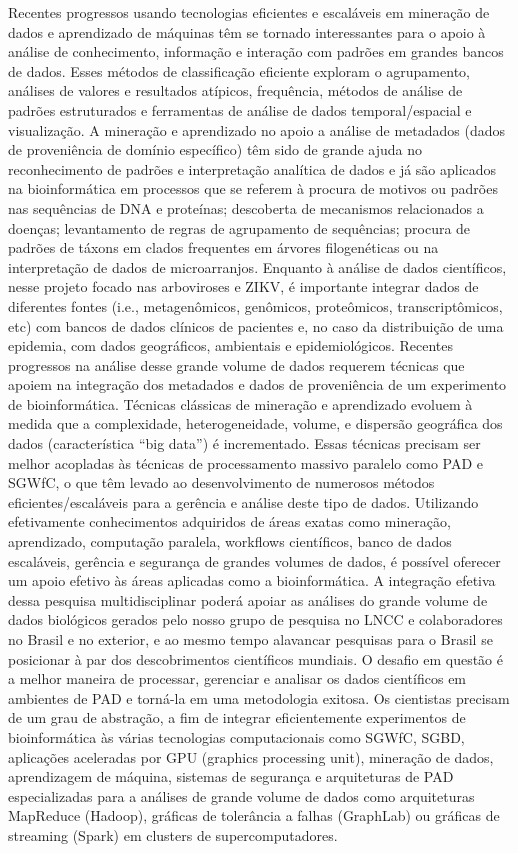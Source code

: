 Recentes progressos usando tecnologias eficientes e escaláveis em mineração de dados e aprendizado de máquinas têm se tornado interessantes para o apoio à análise de conhecimento, informação e interação com padrões em grandes bancos de dados. Esses métodos de classificação eficiente exploram o agrupamento, análises de valores e resultados atípicos, frequência, métodos de análise de padrões estruturados e ferramentas de análise de dados temporal/espacial e visualização. A mineração e aprendizado no apoio a análise de metadados (dados de proveniência de domínio específico) têm sido de grande ajuda no reconhecimento de padrões e interpretação analítica de dados e já são aplicados na bioinformática em processos que se referem à procura de motivos ou padrões nas sequências de DNA e proteínas; descoberta de mecanismos relacionados a doenças; levantamento de regras de agrupamento de sequências; procura de padrões de táxons em clados frequentes em árvores filogenéticas ou na interpretação de dados de microarranjos. 
Enquanto à análise de dados científicos, nesse projeto focado nas arboviroses e ZIKV, é importante integrar dados de diferentes fontes (i.e., metagenômicos, genômicos, proteômicos, transcriptômicos, etc) com bancos de dados clínicos de pacientes e, no caso da distribuição de uma epidemia, com dados geográficos, ambientais e epidemiológicos. Recentes progressos na análise desse grande volume de dados requerem técnicas que apoiem na integração dos metadados e dados de proveniência de um experimento de bioinformática. Técnicas clássicas de mineração e aprendizado evoluem à medida que a complexidade, heterogeneidade, volume, e dispersão geográfica dos dados (característica “big data”) é incrementado. Essas técnicas precisam ser melhor acopladas às técnicas de processamento massivo paralelo como PAD e SGWfC, o que têm levado ao desenvolvimento de numerosos métodos eficientes/escaláveis para a gerência e análise deste tipo de dados. Utilizando efetivamente conhecimentos adquiridos de áreas exatas como mineração, aprendizado, computação paralela, workflows científicos, banco de dados escaláveis, gerência e segurança de grandes volumes de dados, é possível oferecer um apoio efetivo às áreas aplicadas como a bioinformática. A integração efetiva dessa pesquisa multidisciplinar poderá apoiar as análises do grande volume de dados biológicos gerados pelo nosso grupo de pesquisa no LNCC e colaboradores no Brasil e no exterior, e ao mesmo tempo alavancar pesquisas para o Brasil se posicionar à par dos descobrimentos científicos mundiais.
O desafio em questão é a melhor maneira de processar, gerenciar e analisar os dados científicos em ambientes de PAD e torná-la em uma metodologia exitosa. Os cientistas precisam de um grau de abstração, a fim de integrar eficientemente experimentos de bioinformática às várias tecnologias computacionais como SGWfC, SGBD, aplicações aceleradas por GPU (graphics processing unit), mineração de dados, aprendizagem de máquina, sistemas de segurança e arquiteturas de PAD especializadas para a análises de grande volume de dados como arquiteturas MapReduce (Hadoop), gráficas de tolerância a falhas (GraphLab) ou gráficas de streaming (Spark) em clusters de supercomputadores. 

